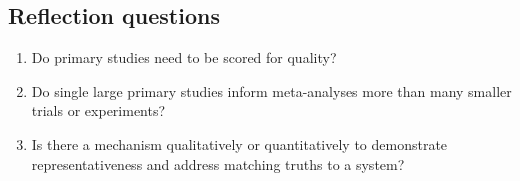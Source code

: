 \documentclass[
]{book}
\providecommand{\tightlist}{%
  \setlength{\itemsep}{0pt}\setlength{\parskip}{0pt}}
\begin{document}
\hypertarget{reflection-questions-3}{%
\subsection*{Reflection questions}\label{reflection-questions-3}}

\begin{enumerate}
\def\labelenumi{\arabic{enumi}.}
\tightlist
\item
  Do primary studies need to be scored for quality?
\item
  Do single large primary studies inform meta-analyses more than many smaller trials or experiments?\\
\item
  Is there a mechanism qualitatively or quantitatively to demonstrate representativeness and address matching truths to a system?
\end{enumerate}

  
\end{document}
